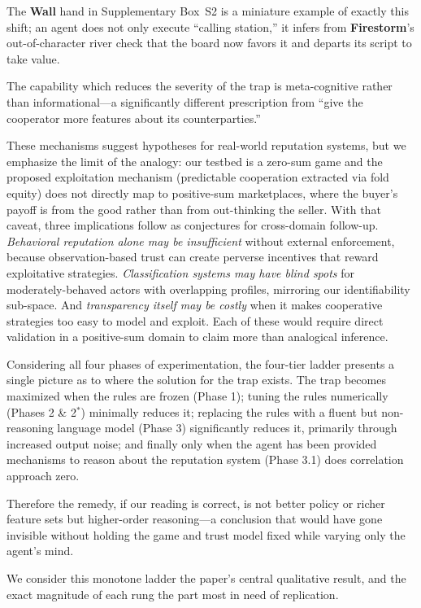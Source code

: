 \documentclass[journal]{IEEEtran}
\newcommand{\arch}[1]{\textbf{#1}}
\begin{document}
The \arch{Wall} hand in Supplementary Box~S2 is a miniature example of exactly this shift;
an agent does not only execute ``calling station,'' it infers from
\arch{Firestorm}'s out-of-character river check that the board now favors it and
departs its script to take value.

The capability which reduces the severity of the trap is meta-cognitive
rather than informational---a significantly different prescription from ``give
the cooperator more features about its counterparties.''

These mechanisms suggest hypotheses for real-world reputation
systems, but we emphasize the limit of the analogy: our testbed
is a zero-sum game and the proposed exploitation mechanism
(predictable cooperation extracted via fold equity) does not
directly map to positive-sum marketplaces, where the buyer's
payoff is from the good rather than from out-thinking the seller.
With that caveat, three implications follow as conjectures for
cross-domain follow-up. \textit{Behavioral reputation alone may
be insufficient} without external enforcement, because
observation-based trust can create perverse incentives that
reward exploitative strategies. \textit{Classification systems
may have blind spots} for moderately-behaved actors with
overlapping profiles, mirroring our identifiability sub-space.
And \textit{transparency itself may be costly} when it makes
cooperative strategies too easy to model and exploit. Each of
these would require direct validation in a positive-sum domain
to claim more than analogical inference.

Considering all four phases of experimentation, the four-tier ladder presents
a single picture as to where the solution for the trap exists. The trap becomes
maximized when the rules are frozen (Phase 1); tuning the rules numerically
(Phases 2 \& 2$^{*}$) minimally reduces it; replacing the rules with a fluent but
non-reasoning language model (Phase 3) significantly reduces it, primarily
through increased output noise; and finally only when the agent has been provided
mechanisms to reason about the reputation system (Phase 3.1) does correlation
approach zero.

Therefore the remedy, if our reading is correct, is not better policy or
richer feature sets but higher-order reasoning---a conclusion that would have
gone invisible without holding the game and trust model fixed while varying only
the agent's mind.

We consider this monotone ladder the paper's central qualitative result, and
the exact magnitude of each rung the part most in need of replication.
\end{document}
